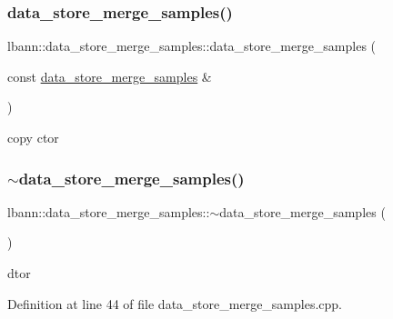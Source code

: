 \subsubsection{\texorpdfstring{data\+\_\+store\+\_\+merge\+\_\+samples()}{data\_store\_merge\_samples()}\hspace{0.1cm}{\footnotesize\ttfamily [2/2]}}
{\footnotesize\ttfamily lbann\+::data\+\_\+store\+\_\+merge\+\_\+samples\+::data\+\_\+store\+\_\+merge\+\_\+samples (\begin{DoxyParamCaption}\item[{const \hyperlink{classlbann_1_1data__store__merge__samples}{data\+\_\+store\+\_\+merge\+\_\+samples} \&}]{ }\end{DoxyParamCaption})\hspace{0.3cm}{\ttfamily [default]}}



copy ctor 

\mbox{\label{classlbann_1_1data__store__merge__samples_a29eb31269a1369f6f28439e90ed8ad49}} 
\subsubsection{\texorpdfstring{$\sim$data\+\_\+store\+\_\+merge\+\_\+samples()}{~data\_store\_merge\_samples()}}
{\footnotesize\ttfamily lbann\+::data\+\_\+store\+\_\+merge\+\_\+samples\+::$\sim$data\+\_\+store\+\_\+merge\+\_\+samples (\begin{DoxyParamCaption}{ }\end{DoxyParamCaption})\hspace{0.3cm}{\ttfamily [override]}}



dtor 



Definition at line 44 of file data\+\_\+store\+\_\+merge\+\_\+samples.\+cpp.


